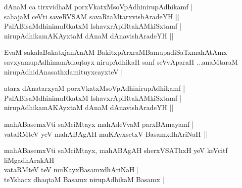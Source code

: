 \begin{entry}
\begin{shl}
dAnaM ca tirxvidhaM porxVkatxMsoVpAdhinirupAdhikamf |\\
sahajaM ceVti saveRVSAM savaRtaMtarxvishAradeYH ||\\
PalABisaMdhinimuRkatxM IshavxrApiRtakAMkiSxtamf |\\
nirupAdhikamAKAyxtaM dAnaM dAnavishAradeYH ||
\end{shl}
\end{entry}

\begin{entry}
\begin{shl}
EvaM sakalaBakatxjanAnAM BakitxpArxraMBamupadiSaTxmahAtAmx savxyamupAdhimanAdaqtayx
nirupAdhikaH sanf seVvAparaH
...anaMtaraM nirupAdhidAnasathxlamituyxcayxteV |
\end{shl}
\begin{shl}
atarx dAnatarxyaM porxVkatxMsoVpAdhinirupAdhikamf |\\
PalABisaMdhinimuRkatxM IshavxrApiRtakAMkiSxtamf |\\
nirupAdhikamAKAyxtaM dAnaM dAnavishAradeYH ||
\end{shl}
\end{entry}

\begin{entry}
\begin{shl}
mahABasemxVti saMciMtayx mahAdeVvaM parxBAmayamf |\\
vataRMteV yeV mahABAgAH muKAyxsetxV BasamxdhAriNaH ||
\end{shl}
\begin{shl}
mahABasemxVti saMciMtayx, mahABAgAH sherxVSAThxH yeV keVcitf liMgadhArakAH\\
vataRMteV teV muKayxBasamxdhAriNaH |\\
teYshacx dhaqtaM Basamx nirupAdhikaM Basamx |
\end{shl}
\end{entry}

